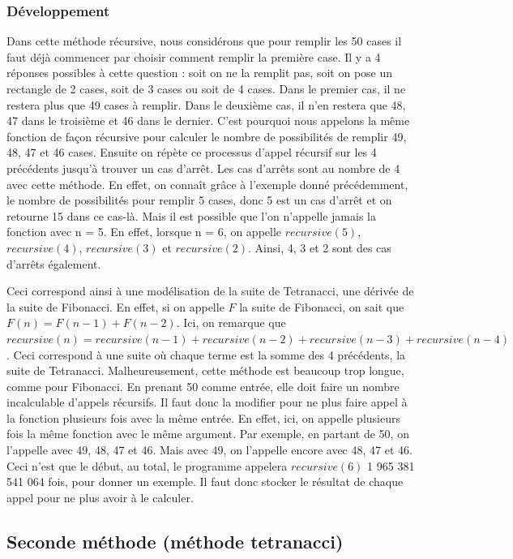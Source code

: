 \documentclass{article}
\begin{document}


\subsubsection{Développement}
Dans cette méthode récursive, nous considérons que pour remplir les 50 cases il faut déjà commencer par choisir comment remplir la première case. Il y a 4 réponses possibles à cette question : soit on ne la remplit pas, soit on pose un rectangle de 2 cases, soit de 3 cases ou soit de 4 cases. Dans le premier cas, il ne restera plus que 49 cases à remplir. Dans le deuxième cas, il n'en restera que 48, 47 dans le troisième et 46 dans le dernier. C'est pourquoi nous appelons la même fonction de façon récursive pour calculer le nombre de possibilités de remplir 49, 48, 47 et 46 cases. Ensuite on répète ce processus d'appel récursif sur les 4 précédents jusqu'à trouver un cas d'arrêt. Les cas d'arrêts sont au nombre de 4 avec cette méthode. En effet, on connaît grâce à l'exemple donné précédemment, le nombre de possibilités pour remplir 5 cases, donc 5 est un cas d'arrêt et on retourne 15 dans ce cas-là. Mais il est possible que l'on n'appelle jamais la fonction avec n = 5. En effet, lorsque n = 6, on appelle $recursive(5)$, $recursive(4)$, $recursive(3)$ et $recursive(2)$. Ainsi, 4, 3 et 2 sont des cas d'arrêts également.

Ceci correspond ainsi à une modélisation de la suite de Tetranacci, une dérivée de la suite de Fibonacci. En effet, si on appelle $F$ la suite de Fibonacci, on sait que $F(n) = F(n-1) + F(n-2)$. Ici, on remarque que $recursive(n) = recursive(n-1) + recursive(n-2) + recursive(n-3) + recursive(n-4)$. Ceci correspond à une suite où chaque terme est la somme des 4 précédents, la suite de Tetranacci. Malheureusement, cette méthode est beaucoup trop longue, comme pour Fibonacci. En prenant 50 comme entrée, elle doit faire un nombre incalculable d'appels récursifs. Il faut donc la modifier pour ne plus faire appel à la fonction plusieurs fois avec la même entrée. En effet, ici, on appelle plusieurs fois la même fonction avec le même argument. Par exemple, en partant de 50, on l'appelle avec 49, 48, 47 et 46. Mais avec 49, on l'appelle encore avec 48, 47 et 46. Ceci n'est que le début, au total, le programme appelera $recursive(6)$ 1 965 381 541 064  fois, pour donner un exemple. Il faut donc stocker le résultat de chaque appel pour ne plus avoir à le calculer.
\subsection{Seconde méthode (méthode tetranacci)}
\end{document}
